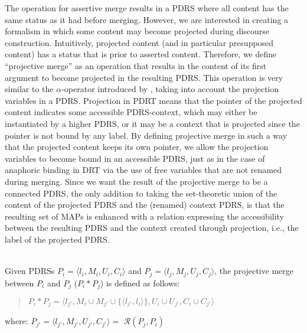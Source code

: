 \noindent The operation for assertive merge results in a PDRS where all
content has the same status as it had before merging. However, we are
interested in creating a formalism in which some content may become
projected during discourse construction.  Intuitively, projected content
(and in particular presupposed content) has a status that is prior to
asserted content.  Therefore, we define ``projective merge'' as an operation
that results in the content of its first argument to become projected in the
resulting PDRS.  This operation is very similar to the $\alpha$-operator
introduced by \cite{bos2003implementing}, taking into account the projection
variables in a PDRS. Projection in PDRT means that the pointer of the
projected content indicates some accessible PDRS-context, which may either
be instantiated by a higher PDRS, or it may be a context that is projected
since the pointer is not bound by any label. By defining projective merge in
such a way that the projected content keeps its own pointer, we allow the
projection variables to become bound in an accessible PDRS, just as in the
case of anaphoric binding in DRT via the use of free variables that are not
renamed during merging. Since we want the result of the projective merge to
be a connected PDRS, the only addition to taking the set-theoretic union of
the content of the projected PDRS and the (renamed) context PDRS, is that
the resulting set of MAPs is enhanced with a relation expressing the
accessibility between the resulting PDRS and the context created through
projection, i.e., the label of the projected PDRS.

\begin{definition}\label{def:pmerge}~\\
Given PDRSs $P_i=\langle l_i,M_i,U_i,C_i \rangle$ and 
$P_j=\langle l_j,M_j,U_j,C_j\rangle$, the projective merge between $P_i$
and $P_j$ ($P_i \ast P_j$) is defined as follows:
  \begin{quote}
    $P_i \ast P_j = 
      \langle l_{j'}, 
        M_{i}\cup M_{j'}\cup\{\langle l_{j'},l_{i}\rangle\}, 
        U_{i}\cup U_{j'},C_{i} \cup C_{j'}\rangle$
  \end{quote}
  where: $P_{j'} = \langle l_{j'}, M_{j'}, U_{j'}, C_{j'} \rangle =$ 
      $\mathcal{R}(P_j,P_i)$
\end{definition}

